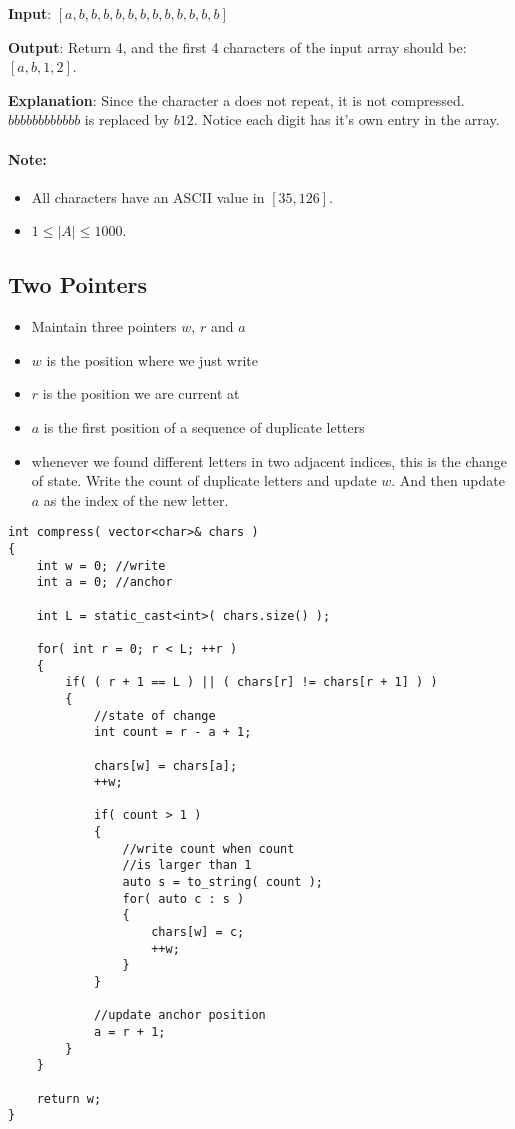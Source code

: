\begin{flushleft}
\textbf{Input}: $[a,b,b,b,b,b,b,b,b,b,b,b,b]$

\textbf{Output}: Return 4, and the first 4 characters of the input array should be: $[a,b,1,2]$.

\textbf{Explanation}: Since the character a does not repeat, it is not compressed. $bbbbbbbbbbbb$ is replaced by $b12$. Notice each digit has it's own entry in the array.
 

\end{flushleft}


\paragraph{Note:}

\begin{itemize}
\item All characters have an ASCII value in $[35, 126]$.
\item $1 \leq \lvert A\rvert \leq 1000$.
\end{itemize}

\subsection{Two Pointers}
\begin{itemize}
\item Maintain three pointers $w$, $r$ and $a$
\item $w$ is the position where we just write
\item $r$ is the position we are current at
\item $a$ is the first position of a sequence of duplicate letters
\item whenever we found different letters in two adjacent indices, this is the change of state. Write the count of duplicate letters and update $w$. And then update $a$ as the index of the new letter.
\end{itemize}

\setcounter{lstlisting}{0}
\begin{lstlisting}[style=customc, caption={Read And Write Pointers}]
int compress( vector<char>& chars )
{
    int w = 0; //write
    int a = 0; //anchor

    int L = static_cast<int>( chars.size() );

    for( int r = 0; r < L; ++r )
    {
        if( ( r + 1 == L ) || ( chars[r] != chars[r + 1] ) )
        {
            //state of change
            int count = r - a + 1;

            chars[w] = chars[a];
            ++w;

            if( count > 1 )
            {
                //write count when count
                //is larger than 1
                auto s = to_string( count );
                for( auto c : s )
                {
                    chars[w] = c;
                    ++w;
                }
            }

            //update anchor position
            a = r + 1;
        }
    }

    return w;
}
\end{lstlisting}